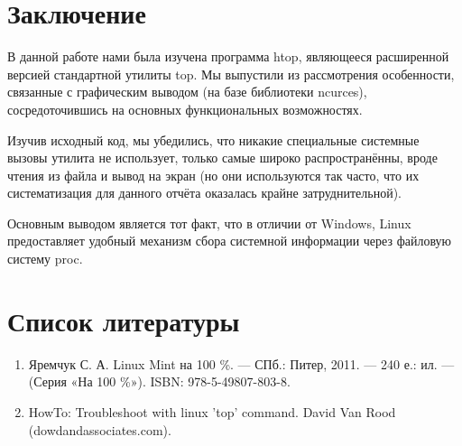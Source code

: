\documentclass[a4paper, 12pt]{article}		%
\begin{document}
\newpage
\section*{Заключение}

В данной работе нами была изучена программа htop, являющееся расширенной версией стандартной утилиты top. Мы выпустили из рассмотрения особенности, связанные с графическим выводом (на базе библиотеки ncurces), сосредоточившись на основных функциональных возможностях.

Изучив исходный код, мы убедились, что никакие специальные системные вызовы утилита не использует, только самые широко распространённы, вроде чтения из файла и вывод на экран (но они используются так часто, что их систематизация для данного отчёта оказалась крайне затруднительной).

Основным выводом является тот факт, что в отличии от Windows, Linux предоставляет удобный механизм сбора системной информации через файловую систему proc.

\newpage
\section*{Список литературы}

\begin{enumerate}
\item Яремчук С. А.  Linux Mint на 100 \%. — СПб.: Питер, 2011. — 240 е.: ил. — (Серия «На 100 \%»). ISBN: 978-5-49807-803-8.
\item HowTo: Troubleshoot with linux 'top' command. David Van Rood (dowdandassociates.com). 
\end{enumerate}
\end{document}
